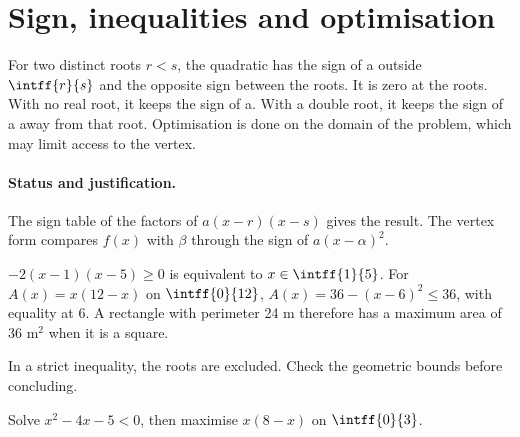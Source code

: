 \section{Sign, inequalities and optimisation}\label{C02-U4}
\begin{keypoint}
For two distinct roots $r<s$, the quadratic has the sign of a outside $\intff{r}{s}$ and the opposite sign between the roots. It is zero at the roots. With no real root, it keeps the sign of a. With a double root, it keeps the sign of a away from that root. Optimisation is done on the domain of the problem, which may limit access to the vertex.
\end{keypoint}
\paragraph{Status and justification.} The sign table of the factors of $a(x-r)(x-s)$ gives the result. The vertex form compares $f(x)$ with $\beta$ through the sign of $a(x-\alpha)^2$.
\begin{example}$-2(x-1)(x-5)\geq0$ is equivalent to $x\in\intff{1}{5}$. For $A(x)=x(12-x)$ on $\intff{0}{12}$, $A(x)=36-(x-6)^2\leq36$, with equality at 6. A rectangle with perimeter 24 m therefore has a maximum area of 36 m$^2$ when it is a square.\end{example}\label{C02-EX4}
\begin{pitfall}In a strict inequality, the roots are excluded. Check the geometric bounds before concluding.\end{pitfall}
\begin{application}Solve $x^2-4x-5<0$, then maximise $x(8-x)$ on $\intff{0}{3}$.\end{application}\label{C02-AP4}
\mxnewpage
